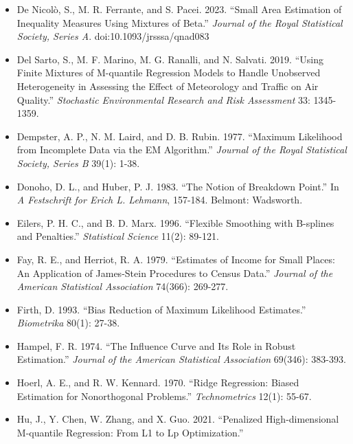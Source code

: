 \documentclass[UTF8, fontset=macnew, a4paper, 12pt]{ctexart}
\begin{document}
\begin{itemize}[leftmargin=2em, itemsep=2pt, parsep=0pt]
        Regression for Multi-category Outcomes with Application to Small Area
        Estimation of Labour Force Participation.''
        \textit{Journal of the Royal Statistical Society, Series A}.
        doi:10.1111/rssa.12953
  \item[] De Nicol\`o, S., M. R. Ferrante, and S. Pacei. 2023. ``Small Area
        Estimation of Inequality Measures Using Mixtures of Beta.''
        \textit{Journal of the Royal Statistical Society, Series A}.
        doi:10.1093/jrsssa/qnad083
  \item[] Del Sarto, S., M. F. Marino, M. G. Ranalli, and N. Salvati. 2019.
        ``Using Finite Mixtures of M-quantile Regression Models to Handle
        Unobserved Heterogeneity in Assessing the Effect of Meteorology and
        Traffic on Air Quality.'' \textit{Stochastic Environmental Research and
        Risk Assessment} 33: 1345-1359.
  \item[] Dempster, A. P., N. M. Laird, and D. B. Rubin. 1977. ``Maximum
        Likelihood from Incomplete Data via the EM Algorithm.''
        \textit{Journal of the Royal Statistical Society, Series B} 39(1): 1-38.
  \item[] Donoho, D. L., and Huber, P. J. 1983. ``The Notion of Breakdown Point.''
        In \textit{A Festschrift for Erich L. Lehmann}, 157-184. Belmont: Wadsworth.
  \item[] Eilers, P. H. C., and B. D. Marx. 1996. ``Flexible Smoothing with
        B-splines and Penalties.'' \textit{Statistical Science} 11(2): 89-121.
  \item[] Fay, R. E., and Herriot, R. A. 1979. ``Estimates of Income for Small
        Places: An Application of James-Stein Procedures to Census Data.''
        \textit{Journal of the American Statistical Association} 74(366): 269-277.
  \item[] Firth, D. 1993. ``Bias Reduction of Maximum Likelihood Estimates.''
        \textit{Biometrika} 80(1): 27-38.
  \item[] Hampel, F. R. 1974. ``The Influence Curve and Its Role in Robust
        Estimation.'' \textit{Journal of the American Statistical Association}
        69(346): 383-393.
  \item[] Hoerl, A. E., and R. W. Kennard. 1970. ``Ridge Regression: Biased
        Estimation for Nonorthogonal Problems.'' \textit{Technometrics} 12(1): 55-67.
  \item[] Hu, J., Y. Chen, W. Zhang, and X. Guo. 2021. ``Penalized
        High-dimensional M-quantile Regression: From L1 to Lp Optimization.''

\end{itemize}
\end{document}
